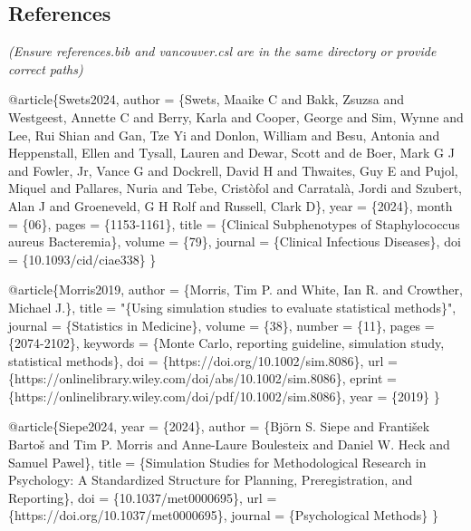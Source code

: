 \documentclass[
  letterpaper,
  DIV=11,
  numbers=noendperiod]{scrartcl}
\newenvironment{Shaded}{\begin{snugshade}}{\end{snugshade}}
\newcommand{\DataTypeTok}[1]{\textcolor[rgb]{0.68,0.00,0.00}{#1}}
\newcommand{\NormalTok}[1]{\textcolor[rgb]{0.00,0.23,0.31}{#1}}
\newcommand{\OtherTok}[1]{\textcolor[rgb]{0.00,0.23,0.31}{#1}}
\newcommand{\StringTok}[1]{\textcolor[rgb]{0.13,0.47,0.30}{#1}}
\newcommand{\VariableTok}[1]{\textcolor[rgb]{0.07,0.07,0.07}{#1}}
\begin{document}
\subsection{References}\label{references}

\emph{(Ensure references.bib and vancouver.csl are in the same directory
or provide correct paths)}

\begin{Shaded}
\begin{Highlighting}[]
\VariableTok{@article}\NormalTok{\{}\OtherTok{Swets2024}\NormalTok{,}
  \DataTypeTok{author}\NormalTok{ = \{Swets, Maaike C and Bakk, Zsuzsa and Westgeest, Annette C and Berry, Karla and Cooper, George and Sim, Wynne and Lee, Rui Shian and Gan, Tze Yi and Donlon, William and Besu, Antonia and Heppenstall, Ellen and Tysall, Lauren and Dewar, Scott and de Boer, Mark G J and Fowler, Jr, Vance G and Dockrell, David H and Thwaites, Guy E and Pujol, Miquel and Pallares, Nuria and Tebe, Cristòfol and Carratalà, Jordi and Szubert, Alan J and Groeneveld, G H Rolf and Russell, Clark D\},}
  \DataTypeTok{year}\NormalTok{ = \{2024\},}
  \DataTypeTok{month}\NormalTok{ = \{06\},}
  \DataTypeTok{pages}\NormalTok{ = \{1153{-}1161\},}
  \DataTypeTok{title}\NormalTok{ = \{Clinical Subphenotypes of Staphylococcus aureus Bacteremia\},}
  \DataTypeTok{volume}\NormalTok{ = \{79\},}
  \DataTypeTok{journal}\NormalTok{ = \{Clinical Infectious Diseases\},}
  \DataTypeTok{doi}\NormalTok{ = \{10.1093/cid/ciae338\}}
\NormalTok{\}}

\VariableTok{@article}\NormalTok{\{}\OtherTok{Morris2019}\NormalTok{,}
    \DataTypeTok{author}\NormalTok{ = \{Morris, Tim P. and White, Ian R. and Crowther, Michael J.\},}
    \DataTypeTok{title}\NormalTok{ = "}\StringTok{\{Using simulation studies to evaluate statistical methods\}}\NormalTok{",}
    \DataTypeTok{journal}\NormalTok{ = \{Statistics in Medicine\},}
    \DataTypeTok{volume}\NormalTok{ = \{38\},}
    \DataTypeTok{number}\NormalTok{ = \{11\},}
    \DataTypeTok{pages}\NormalTok{ = \{2074{-}2102\},}
    \DataTypeTok{keywords}\NormalTok{ = \{Monte Carlo, reporting guideline, simulation study, statistical methods\},}
    \DataTypeTok{doi}\NormalTok{ = \{https://doi.org/10.1002/sim.8086\},}
    \DataTypeTok{url}\NormalTok{ = \{https://onlinelibrary.wiley.com/doi/abs/10.1002/sim.8086\},}
    \DataTypeTok{eprint}\NormalTok{ = \{https://onlinelibrary.wiley.com/doi/pdf/10.1002/sim.8086\},}
    \DataTypeTok{year}\NormalTok{ = \{2019\}}
\NormalTok{\}}

\VariableTok{@article}\NormalTok{\{}\OtherTok{Siepe2024}\NormalTok{,}
    \DataTypeTok{year}\NormalTok{ = \{2024\},}
    \DataTypeTok{author}\NormalTok{ = \{Björn S. Siepe and František Bartoš and Tim P. Morris and Anne{-}Laure Boulesteix and Daniel W. Heck and Samuel Pawel\},}
    \DataTypeTok{title}\NormalTok{ = \{Simulation Studies for Methodological Research in Psychology: A Standardized Structure for Planning, Preregistration, and Reporting\},}
    \DataTypeTok{doi}\NormalTok{ = \{10.1037/met0000695\},}
    \DataTypeTok{url}\NormalTok{ = \{https://doi.org/10.1037/met0000695\},}
    \DataTypeTok{journal}\NormalTok{ = \{Psychological Methods\}}
\NormalTok{\}}


\end{Highlighting}
\end{Shaded}
\end{document}
